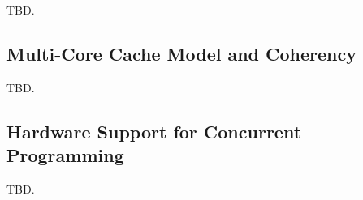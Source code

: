 TBD.


\subsection{Multi-Core Cache Model and Coherency}
\label{scfp0:smcc0}

TBD.


\subsection{Hardware Support for Concurrent Programming}
\label{scfp0:shsc0}

TBD.
